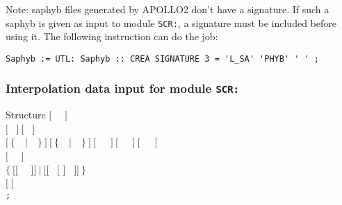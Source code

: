 Note: {\sc saphyb} files generated by APOLLO2 don't have a signature. If such a {\sc saphyb} is given as input
to module {\tt SCR:}, a signature must be included before using it. The following instruction
can do the job:
\begin{verbatim}
Saphyb := UTL: Saphyb :: CREA SIGNATURE 3 = 'L_SA' 'PHYB' ' ' ;
\end{verbatim}

\subsubsection{Interpolation data input for module {\tt SCR:}}\label{sect:descscr}

\vskip -0.5cm

\begin{DataStructure}{Structure }
$[$~ ~$]$ \\
$[$~ $]~[$~ $]$ \\
$[~\{$~~$|$~~$\}~]~[~\{$~~$|$~~$\}~]~[$~~~$]~[$~~~$]~[$~~~$]$ \\
$[$~ ~$]$ \\
$\{~[[$~  ~$]]~|~[[$~  $[$  $]$  ~$]]~\}$ \\
$[$  $]$ \\
{\tt ;}
\end{DataStructure}

